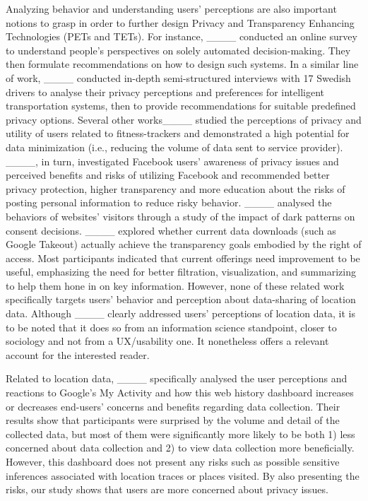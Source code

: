 Analyzing behavior and understanding users' perceptions are also important notions to grasp in order to further design Privacy and Transparency Enhancing Technologies (PETs and TETs).
For instance, 
____ conducted an online survey to understand people’s perspectives on solely automated decision-making. They then formulate recommendations on how to design such systems.
In a similar line of work, 
____ conducted in-depth semi-structured interviews with 17 Swedish drivers to analyse their privacy perceptions and preferences for intelligent transportation systems, then to provide recommendations for suitable predefined privacy options.
Several other works____ studied the perceptions of privacy and utility of users related to fitness-trackers and demonstrated a high potential for data minimization (i.e., reducing the volume of data sent to service provider).
____, in turn, investigated Facebook users' awareness of privacy issues and perceived benefits and risks of utilizing Facebook and recommended better privacy protection, higher transparency and more education about the risks of posting personal information to reduce risky behavior. 
____ analysed the behaviors of websites' visitors through a study of the impact of dark patterns on consent decisions. 
____ explored whether current data downloads (such as Google Takeout) actually achieve the transparency goals embodied by the right of access. Most participants indicated that current offerings need improvement to be useful, emphasizing the need for better filtration, visualization, and summarizing to help them hone in on key information.
However, none of these related work specifically targets users' behavior and perception about data-sharing of location data.
Although 
____ clearly addressed users' perceptions of location data, it is to be noted that it does so from an information science standpoint, %
closer to sociology and not from a UX/usability one.
It nonetheless offers a relevant account for the interested reader.


Related to location data, 
____ specifically analysed the user perceptions and reactions to Google's My Activity and how this web history dashboard increases or decreases end-users' concerns and benefits regarding data collection. Their results show that participants were surprised by the volume and detail of the collected data, but most of them were significantly more likely to be both 1) less concerned about data collection and 2) to view data collection more beneficially. However, this dashboard does not present any risks such as possible sensitive inferences associated with location traces or places visited. By also presenting the risks, our study shows that users are more concerned about privacy issues.


